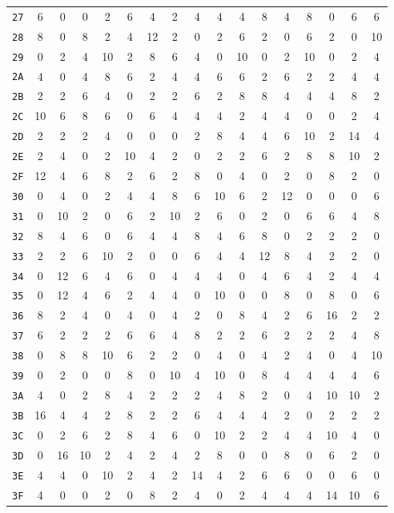 \begin{center}
\begin{small}
\begin{longtable}{c|cccccccccccccccc}
\texttt{27} & 6 & 0 & 0 & 2 & 6 & 4 & 2 & 4 & 4 & 4 & 8 & 4 & 8 & 0 & 6 & 6 \\
\texttt{28} & 8 & 0 & 8 & 2 & 4 & 12 & 2 & 0 & 2 & 6 & 2 & 0 & 6 & 2 & 0 & 10 \\
\texttt{29} & 0 & 2 & 4 & 10 & 2 & 8 & 6 & 4 & 0 & 10 & 0 & 2 & 10 & 0 & 2 & 4 \\
\texttt{2A} & 4 & 0 & 4 & 8 & 6 & 2 & 4 & 4 & 6 & 6 & 2 & 6 & 2 & 2 & 4 & 4 \\
\texttt{2B} & 2 & 2 & 6 & 4 & 0 & 2 & 2 & 6 & 2 & 8 & 8 & 4 & 4 & 4 & 8 & 2 \\
\texttt{2C} & 10 & 6 & 8 & 6 & 0 & 6 & 4 & 4 & 4 & 2 & 4 & 4 & 0 & 0 & 2 & 4 \\
\texttt{2D} & 2 & 2 & 2 & 4 & 0 & 0 & 0 & 2 & 8 & 4 & 4 & 6 & 10 & 2 & 14 & 4 \\
\texttt{2E} & 2 & 4 & 0 & 2 & 10 & 4 & 2 & 0 & 2 & 2 & 6 & 2 & 8 & 8 & 10 & 2 \\
\texttt{2F} & 12 & 4 & 6 & 8 & 2 & 6 & 2 & 8 & 0 & 4 & 0 & 2 & 0 & 8 & 2 & 0 \\
\texttt{30} & 0 & 4 & 0 & 2 & 4 & 4 & 8 & 6 & 10 & 6 & 2 & 12 & 0 & 0 & 0 & 6 \\
\texttt{31} & 0 & 10 & 2 & 0 & 6 & 2 & 10 & 2 & 6 & 0 & 2 & 0 & 6 & 6 & 4 & 8 \\
\texttt{32} & 8 & 4 & 6 & 0 & 6 & 4 & 4 & 8 & 4 & 6 & 8 & 0 & 2 & 2 & 2 & 0 \\
\texttt{33} & 2 & 2 & 6 & 10 & 2 & 0 & 0 & 6 & 4 & 4 & 12 & 8 & 4 & 2 & 2 & 0 \\
\texttt{34} & 0 & 12 & 6 & 4 & 6 & 0 & 4 & 4 & 4 & 0 & 4 & 6 & 4 & 2 & 4 & 4 \\
\texttt{35} & 0 & 12 & 4 & 6 & 2 & 4 & 4 & 0 & 10 & 0 & 0 & 8 & 0 & 8 & 0 & 6 \\
\texttt{36} & 8 & 2 & 4 & 0 & 4 & 0 & 4 & 2 & 0 & 8 & 4 & 2 & 6 & 16 & 2 & 2 \\
\texttt{37} & 6 & 2 & 2 & 2 & 6 & 6 & 4 & 8 & 2 & 2 & 6 & 2 & 2 & 2 & 4 & 8 \\
\texttt{38} & 0 & 8 & 8 & 10 & 6 & 2 & 2 & 0 & 4 & 0 & 4 & 2 & 4 & 0 & 4 & 10 \\
\texttt{39} & 0 & 2 & 0 & 0 & 8 & 0 & 10 & 4 & 10 & 0 & 8 & 4 & 4 & 4 & 4 & 6 \\
\texttt{3A} & 4 & 0 & 2 & 8 & 4 & 2 & 2 & 2 & 4 & 8 & 2 & 0 & 4 & 10 & 10 & 2 \\
\texttt{3B} & 16 & 4 & 4 & 2 & 8 & 2 & 2 & 6 & 4 & 4 & 4 & 2 & 0 & 2 & 2 & 2 \\
\texttt{3C} & 0 & 2 & 6 & 2 & 8 & 4 & 6 & 0 & 10 & 2 & 2 & 4 & 4 & 10 & 4 & 0 \\
\texttt{3D} & 0 & 16 & 10 & 2 & 4 & 2 & 4 & 2 & 8 & 0 & 0 & 8 & 0 & 6 & 2 & 0 \\
\texttt{3E} & 4 & 4 & 0 & 10 & 2 & 4 & 2 & 14 & 4 & 2 & 6 & 6 & 0 & 0 & 6 & 0 \\
\texttt{3F} & 4 & 0 & 0 & 2 & 0 & 8 & 2 & 4 & 0 & 2 & 4 & 4 & 4 & 14 & 10 & 6 \\ \bottomrule
\end{longtable}
\end{small}
\end{center}


